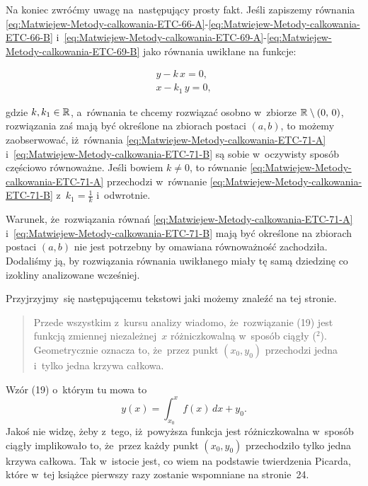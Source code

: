 \documentclass[a4paper,11pt]{article}
\numberwithin{equation}{section}
\begin{document}
Na koniec zwróćmy uwagę na~następujący prosty fakt. Jeśli zapiszemy równania
\eqref{eq:Matwiejew-Metody-calkowania-ETC-66-A}-\eqref{eq:Matwiejew-Metody-calkowania-ETC-66-B} i~\eqref{eq:Matwiejew-Metody-calkowania-ETC-69-A}-\eqref{eq:Matwiejew-Metody-calkowania-ETC-69-B} jako równania uwikłane na funkcje:

\negVerSpaceFour


\begin{subequations}

  \begin{align}
    \label{eq:Matwiejew-Metody-calkowania-ETC-71-A}
    y - k \, x = 0, \\
    \label{eq:Matwiejew-Metody-calkowania-ETC-71-B}
    x - k_{ 1 } \, y = 0,
  \end{align}

\end{subequations}


\noindent
gdzie $k, k_{ 1 } \in \mathbb{R}$, a~równania te chcemy rozwiązać osobno w~zbiorze
$\mathbb{R} \setminus ( 0, \, 0 )$, rozwiązania zaś mają być określone na zbiorach postaci
$( a, b )$, to możemy zaobserwować, iż~równania
\eqref{eq:Matwiejew-Metody-calkowania-ETC-71-A}
i~\eqref{eq:Matwiejew-Metody-calkowania-ETC-71-B} są sobie w~oczywisty
sposób częściowo równoważne. Jeśli bowiem $k \neq 0$, to równanie
\eqref{eq:Matwiejew-Metody-calkowania-ETC-71-A} przechodzi w~równanie
\eqref{eq:Matwiejew-Metody-calkowania-ETC-71-B}
z~$k_{ 1 } = \frac{ 1 }{ k }$ i~odwrotnie.

Warunek, że~rozwiązania równań
\eqref{eq:Matwiejew-Metody-calkowania-ETC-71-A}
i~\eqref{eq:Matwiejew-Metody-calkowania-ETC-71-B} mają być określone na
zbiorach postaci $( a, b )$ nie jest potrzebny by omawiana równoważność
zachodziła. Dodaliśmy ją, by rozwiązania równania uwikłanego miały tę samą
dziedzinę co izokliny analizowane wcześniej.

\VerSpaceFour





\noindent
{} Przyjrzyjmy~się następującemu tekstowi jaki możemy znaleźć na tej
stronie.
\begin{quote}

  Przede wszystkim z~kursu analizy wiadomo, że~rozwiązanie (19) jest funkcją
  zmiennej niezależnej~$x$ różniczkowalną w~sposób ciągły (${}^{ 2 }$).
  Geometrycznie oznacza to, że~przez punkt $( x_{ 0 }, y_{ 0 } )$ przechodzi
  jedna i~tylko jedna krzywa całkowa.

\end{quote}
Wzór (19) o~którym tu mowa to
\begin{equation}
  \label{eq:Matwiejew-Metody-calkowania-ETC-72}
  y( x ) =
  \int_{ x_{ 0 } }^{ x } f( x ) \, dx + y_{ 0 }.
\end{equation}
Jakoś nie widzę, żeby z~tego, iż~powyższa funkcja jest różniczkowalna
w~sposób ciągły implikowało to, że~przez każdy punkt $( x_{ 0 }, y_{ 0 } )$
przechodziło tylko jedna krzywa całkowa. Tak w~istocie jest, co wiem na
podstawie twierdzenia Picarda, które w~tej książce pierwszy razy zostanie
wspomniane na stronie~24.
\end{document}
